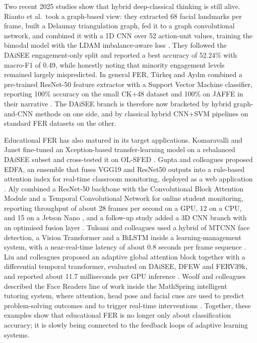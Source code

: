 Two recent 2025 studies show that hybrid deep-classical thinking is still alive. Rianto et al.\ took a graph-based view: they extracted 68 facial landmarks per frame, built a Delaunay triangulation graph, fed it to a graph convolutional network, and combined it with a 1D CNN over 52 action-unit values, training the bimodal model with the LDAM imbalance-aware loss \cite{rianto_engagement_2025}. They followed the DAiSEE engagement-only split and reported a best accuracy of 52.24\% with macro-F1 of 0.49, while honestly noting that minority engagement levels remained largely mispredicted. In general FER, Türkeş and Aydın combined a pre-trained ResNet-50 feature extractor with a Support Vector Machine classifier, reporting 100\% accuracy on the small CK+48 dataset and 100\% on JAFFE in their narrative \cite{turkes_enhanced_2025}. The DAiSEE branch is therefore now bracketed by hybrid graph-and-CNN methods on one side, and by classical hybrid CNN+SVM pipelines on standard FER datasets on the other.

Educational FER has also matured in its target applications. Komaravalli and Janet fine-tuned an Xception-based transfer-learning model on a rebalanced DAiSEE subset and cross-tested it on OL-SFED \cite{komaravalli_detecting_2023}. Gupta and colleagues proposed EDFA, an ensemble that fuses VGG19 and ResNet50 outputs into a rule-based attention index for real-time classroom monitoring, deployed as a web application \cite{gupta_edfa_2023}. Aly combined a ResNet-50 backbone with the Convolutional Block Attention Module and a Temporal Convolutional Network for online student monitoring, reporting throughput of about 28 frames per second on a GPU, 12 on a CPU, and 15 on a Jetson Nano \cite{aly_revolutionizing_2025}, and a follow-up study added a 3D CNN branch with an optimised fusion layer \cite{aly_comprehensive_2025}. Tulsani and colleagues used a hybrid of MTCNN face detection, a Vision Transformer and a BiLSTM inside a learning-management system, with a near-real-time latency of about 0.8 seconds per frame sequence \cite{tulsani_realtime_2025}. Liu and colleagues proposed an adaptive global attention block together with a differential temporal transformer, evaluated on DAiSEE, DFEW and FERV39k, and reported about 11.7 milliseconds per GPU inference \cite{liu_dynamic_2026}. Woolf and colleagues described the Face Readers line of work inside the MathSpring intelligent tutoring system, where attention, head pose and facial cues are used to predict problem-solving outcomes and to trigger real-time interventions \cite{woolf_face_2023}. Together, these examples show that educational FER is no longer only about classification accuracy; it is slowly being connected to the feedback loops of adaptive learning systems.

